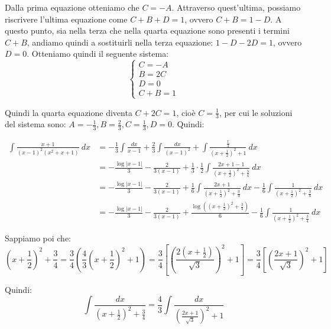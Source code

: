 \documentclass{article}
\begin{document}
\noindent Dalla prima equazione otteniamo che $C = -A$. Attraverso quest'ultima, possiamo riscrivere l'ultima equazione come $C + B + D = 1$, ovvero $C + B = 1 - D$. A questo punto, sia nella terza che nella quarta equazione sono presenti i termini $C + B$, andiamo quindi a sostituirli nella terza equazione: $1 - D - 2D = 1$, ovvero $D = 0$. Otteniamo quindi il seguente sistema:
\begin{equation*}
    \begin{cases}
        C = -A \\
        B = 2C \\
        D = 0 \\
        C + B = 1
    \end{cases}
\end{equation*}

\noindent Quindi la quarta equazione diventa $C + 2C = 1$, cioè $C = \frac{1}{3}$, per cui le soluzioni del sistema sono: $A = -\frac{1}{3}, B = \frac{2}{3}, C = \frac{1}{3}, D = 0$. Quindi:

\begin{align*}
    \int \frac{x + 1}{(x - 1)^2(x^2 + x + 1)} \ dx &= -\frac{1}{3} \int \frac{dx}{x - 1} + \frac{2}{3} \int \frac{dx}{(x - 1)^2} + \int \frac{\frac{x}{3}}{(x + \frac{1}{2})^2 + 1} \ dx \\
    &= -\frac{\log|x - 1|}{3} - \frac{2}{3(x - 1)} + \frac{1}{3} \cdot \frac{1}{2} \int \frac{2x + 1 - 1}{(x + \frac{1}{2})^2 + \frac{3}{4}} \ dx \\
    &= -\frac{\log|x - 1|}{3} - \frac{2}{3(x - 1)} + \frac{1}{6} \int \frac{2x + 1}{(x + \frac{1}{2})^2 + \frac{3}{4}} \ dx - \frac{1}{6} \int \frac{1}{(x + \frac{1}{2})^2 + \frac{3}{4}} \ dx \\
    &= -\frac{\log|x - 1|}{3} - \frac{2}{3(x - 1)} + \frac{\log((x + \frac{1}{2})^2 + \frac{3}{4})}{6} - \frac{1}{6} \int \frac{1}{(x + \frac{1}{2})^2 + \frac{3}{4}} \ dx
\end{align*}

\noindent Sappiamo poi che:
\begin{equation*}
    \left(x + \frac{1}{2}\right)^2 + \frac{3}{4} = \frac{3}{4}\left(\frac{4}{3}\left(x + \frac{1}{2}\right)^2 + 1\right) = \frac{3}{4}\left[\left(\frac{2(x + \frac{1}{2})}{\sqrt{3}}\right)^2 + 1\right]  = \frac{3}{4}\left[\left(\frac{2x + 1}{\sqrt{3}}\right)^2 + 1\right]
\end{equation*}

\noindent Quindi:
\begin{equation*}
    \int \frac{dx}{(x + \frac{1}{2})^2 + \frac{3}{4}} = \frac{4}{3} \int \frac{dx}{(\frac{2x + 1}{\sqrt{3}})^2 + 1}
\end{equation*}
\end{document}
